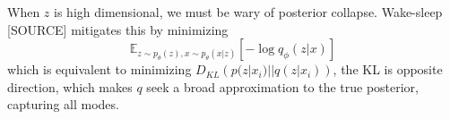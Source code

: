 When $z$ is high dimensional, we must be wary of posterior collapse. Wake-sleep [SOURCE] mitigates this by minimizing $$ \mathbb{E}_{z \sim p_\theta(z), x \sim p_\theta(x|z)} \left[- \log q_\phi (z|x)\right] $$ which is equivalent to minimizing $D_{KL}\left( p(z|x_i) || q(z|x_i) \right)$, the KL is opposite direction, which makes $q$ seek a broad approximation to the true posterior, capturing all modes.



















